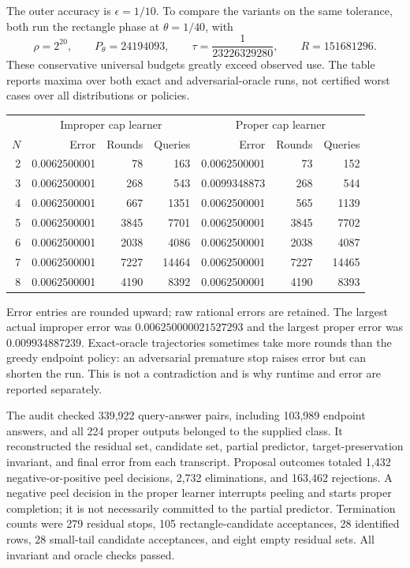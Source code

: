 The outer accuracy is $\epsilon=1/10$. To compare the variants on the same tolerance, both run the rectangle phase at $\theta=1/40$, with
\[
 \rho=2^{20},\qquad P_\theta=24194093,\qquad
 \tau=\frac1{23226329280},\qquad R=151681296.
\]
These conservative universal budgets greatly exceed observed use. The table reports maxima over both exact and adversarial-oracle runs, not certified worst cases over all distributions or policies.

\begin{center}\small
\begin{tabular}{rrrrrrr}
\toprule
&\multicolumn{3}{c}{Improper cap learner}&\multicolumn{3}{c}{Proper cap learner}\\
$N$&Error&Rounds&Queries&Error&Rounds&Queries\\
\midrule
2&0.0062500001&78&163&0.0062500001&73&152\\
3&0.0062500001&268&543&0.0099348873&268&544\\
4&0.0062500001&667&1351&0.0062500001&565&1139\\
5&0.0062500001&3845&7701&0.0062500001&3845&7702\\
6&0.0062500001&2038&4086&0.0062500001&2038&4087\\
7&0.0062500001&7227&14464&0.0062500001&7227&14465\\
8&0.0062500001&4190&8392&0.0062500001&4190&8393\\
\bottomrule
\end{tabular}
\end{center}
Error entries are rounded upward; raw rational errors are retained. The largest actual improper error was $0.006250000021527293$ and the largest proper error was $0.009934887239$. Exact-oracle trajectories sometimes take more rounds than the greedy endpoint policy: an adversarial premature stop raises error but can shorten the run. This is not a contradiction and is why runtime and error are reported separately.

The audit checked 339,922 query-answer pairs, including 103,989 endpoint answers, and all 224 proper outputs belonged to the supplied class. It reconstructed the residual set, candidate set, partial predictor, target-preservation invariant, and final error from each transcript. Proposal outcomes totaled 1,432 negative-or-positive peel decisions, 2,732 eliminations, and 163,462 rejections. A negative peel decision in the proper learner interrupts peeling and starts proper completion; it is not necessarily committed to the partial predictor. Termination counts were 279 residual stops, 105 rectangle-candidate acceptances, 28 identified rows, 28 small-tail candidate acceptances, and eight empty residual sets. All invariant and oracle checks passed.

